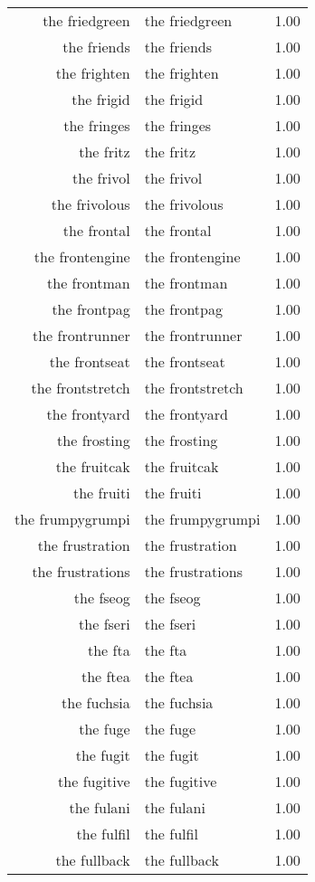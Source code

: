 \begin{table}[ht]
\begin{tabular}{rlr}
  the friedgreen & the friedgreen & 1.00 \\ 
  the friends & the friends & 1.00 \\ 
  the frighten & the frighten & 1.00 \\ 
  the frigid & the frigid & 1.00 \\ 
  the fringes & the fringes & 1.00 \\ 
  the fritz & the fritz & 1.00 \\ 
  the frivol & the frivol & 1.00 \\ 
  the frivolous & the frivolous & 1.00 \\ 
  the frontal & the frontal & 1.00 \\ 
  the frontengine & the frontengine & 1.00 \\ 
  the frontman & the frontman & 1.00 \\ 
  the frontpag & the frontpag & 1.00 \\ 
  the frontrunner & the frontrunner & 1.00 \\ 
  the frontseat & the frontseat & 1.00 \\ 
  the frontstretch & the frontstretch & 1.00 \\ 
  the frontyard & the frontyard & 1.00 \\ 
  the frosting & the frosting & 1.00 \\ 
  the fruitcak & the fruitcak & 1.00 \\ 
  the fruiti & the fruiti & 1.00 \\ 
  the frumpygrumpi & the frumpygrumpi & 1.00 \\ 
  the frustration & the frustration & 1.00 \\ 
  the frustrations & the frustrations & 1.00 \\ 
  the fseog & the fseog & 1.00 \\ 
  the fseri & the fseri & 1.00 \\ 
  the fta & the fta & 1.00 \\ 
  the ftea & the ftea & 1.00 \\ 
  the fuchsia & the fuchsia & 1.00 \\ 
  the fuge & the fuge & 1.00 \\ 
  the fugit & the fugit & 1.00 \\ 
  the fugitive & the fugitive & 1.00 \\ 
  the fulani & the fulani & 1.00 \\ 
  the fulfil & the fulfil & 1.00 \\ 
  the fullback & the fullback & 1.00 \\ 

\end{tabular}
\end{table}
